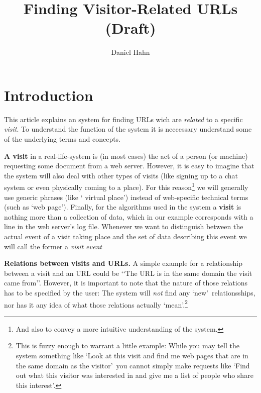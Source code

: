 \documentclass[a4paper]{danarticle}
\begin{document}
  \author{Daniel Hahn}
  \title{Finding Visitor-Related URLs (Draft)}
  \maketitle
  
  \section*{Introduction}
    This article explains an system for finding URLs wich are
    \textit{related} to a specific \textit{visit}. To understand the
    function of the system it is neccessary understand
    some of the underlying terms and concepts.
    
    \textbf{A visit} in a real-life-system is (in most cases) the
    act of a person (or machine) requesting some document from a
    web server. However, it is easy to imagine that the system will
    also deal with other types of visits (like signing up to a
    chat system or even physically coming to a place). For this
    reason\footnote{And also to convey a more intuitive understanding
    of the system.} we will generally use generic phrases (like \lq 
    virtual place\rq ) instead of web-specific technical terms (such
    as \lq web page\rq ). Finally, for the algorithms used in the
    system a \textbf{visit} is nothing more than a collection of
    data, which in our example corresponds with a line in the web
    server's log file. Whenever we want to distinguish between the
    actual event of a visit taking place and the set of data
    describing this event we will call the former a \textit{visit event}
   
    \textbf{Relations between visits and URLs.} A simple example
    for a relationship between a visit and an URL could be
    \lq\lq The URL is in the same domain the visit came from\rq\rq .
    However, it is important to note that the nature of those 
    relations has to be specified by the user: The system will 
    \textit{not} find any \lq new\rq\ relationsships, nor has it 
    any idea of what those relations actually \lq mean\rq .\footnote{This
    is fuzzy enough to warrant a little example: While you may tell the
    system something like \lq Look at this visit and find me web 
    pages that are in the same domain as the visitor\rq\ you cannot
    simply make requests like \lq Find out what this visitor was 
    interested in and give me a list of people who share this
    interest\rq .} 
\end{document}
